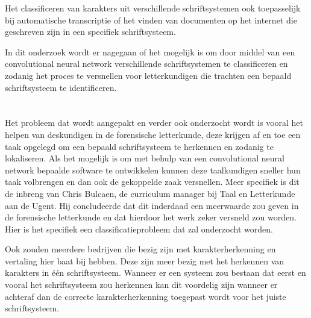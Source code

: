 Het classificeren van karakters uit verschillende schriftsystemen ook toepasselijk bij automatische transcriptie of het vinden van documenten op het internet die geschreven zijn in een specifiek schriftsysteem.

In dit onderzoek wordt er nagegaan of het mogelijk is om door middel van een convolutional neural network verschillende schriftsystemen te classificeren en zodanig het proces te versnellen voor letterkundigen die trachten een bepaald schriftsysteem te identificeren. 

 

\section{}
\label{sec:probleemstelling}


Het probleem dat wordt aangepakt en verder ook onderzocht wordt is vooral het helpen van deskundigen in de forensische letterkunde, deze krijgen af en toe een taak opgelegd om een bepaald schriftsysteem te herkennen en zodanig te lokaliseren.
Als het mogelijk is om met behulp van een convolutional neural network bepaalde software te ontwikkelen kunnen deze taalkundigen sneller hun taak volbrengen en dan ook de gekoppelde zaak versnellen.
Meer specifiek is dit de inbreng van Chris Bulcaen, de curriculum manager bij Taal en Letterkunde aan de Ugent.
Hij concludeerde dat dit inderdaad een meerwaarde zou geven in de forensische letterkunde en dat hierdoor het werk zeker versneld zou worden.
Hier is het specifiek een classificatieprobleem dat zal onderzocht worden.

Ook zouden meerdere bedrijven die bezig zijn met karakterherkenning en vertaling hier baat bij hebben.
Deze zijn meer bezig met het herkennen van karakters in één schriftsysteem.
Wanneer er een systeem zou bestaan dat eerst en vooral het schriftsysteem zou herkennen kan dit voordelig zijn wanneer er achteraf dan de correcte karakterherkenning toegepast wordt voor het juiste schriftsysteem.



